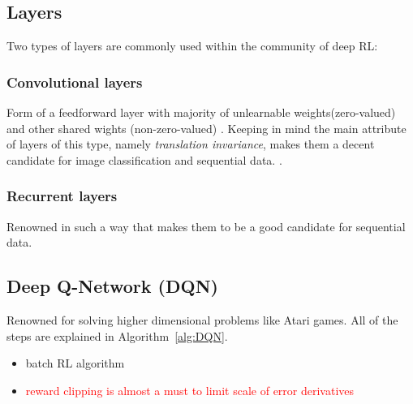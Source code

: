 \documentclass[a4paper,12pt]{article}
\begin{document}
\subsection{Layers}
Two types of layers are commonly used within the community of deep RL:

\subsubsection{Convolutional layers}
Form of a feedforward layer with majority of unlearnable weights(zero-valued) and other shared wights (non-zero-valued) \cite{Francois-Lavet2018}. Keeping in mind the main attribute of layers of this type, namely \textit{translation invariance}, makes them a decent candidate for image classification and sequential data. \cite{lecun1995a, Francois-Lavet2018}.

\subsubsection{Recurrent layers}
Renowned in such a way that makes them to be a good candidate for sequential data.


\subsection{Deep Q-Network (DQN)}
Renowned for solving higher dimensional problems like Atari games. All of the steps are explained in Algorithm~\ref{alg:DQN}.

\begin{itemize}
    \item batch RL algorithm
    \item \textcolor{red}{reward clipping is almost a must to limit scale of error derivatives} \cite{Francois-Lavet2018}
\end{itemize}
\end{document}
